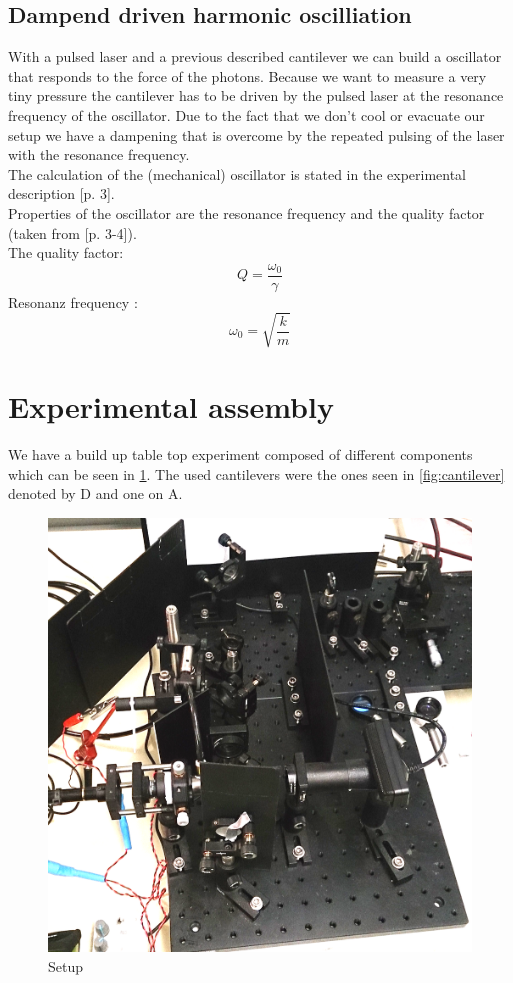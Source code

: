 \documentclass[12pt,a4paper]{article}
\begin{document}
\begin{multicols}{2}
\subsection{Dampend driven harmonic oscilliation}
With a pulsed laser and a previous described cantilever we can build a oscillator that responds to the force of the photons. Because we want to measure a very tiny pressure the cantilever has to be driven by the pulsed laser at the resonance frequency of the oscillator. Due to the fact that we don't cool or evacuate our setup we have a dampening that is overcome by the repeated pulsing of the laser with the resonance frequency.\\
The calculation of the (mechanical) oscillator is stated in the experimental description \cite{physikwiki}[p. 3].\\
Properties of the oscillator are the resonance frequency and the quality factor (taken from \cite{physikwiki}[p. 3-4]).\\
The quality factor:
$$Q = \frac{\omega_{0}}{\gamma}$$
Resonanz frequency :
$$\omega_0 = \sqrt{\frac{k}{m}}$$

\section{Experimental assembly}
We have a build up table top experiment composed of different components which can be seen in \ref{fig:setup}. The used cantilevers were the ones seen in \ref{fig:cantilever} denoted by D and one on A.\\
\begin{figure}[H]
	\centering
	\includegraphics[scale=0.2]{../figures/aufbau.png}
	\caption{Setup}
	\label{fig:setup}
\end{figure}


\end{multicols}
\end{document}
